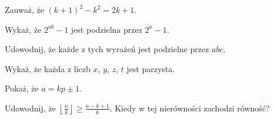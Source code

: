 
\begin{hints_list}
	\item Zauważ, że $(k + 1)^2 - k^2 = 2k + 1$.
	\item Wykaż, że $2^{ab} - 1$ jest podzielna przez $2^a - 1$.
	\item Udowodnij, że każde z tych wyrażeń jest podzielne przez $abc$.
	\item Wykaż, że każda z liczb $x$, $y$, $z$, $t$ jest parzysta.
	\item Pokaż, że $a = kp \pm 1$.
	\item Udowodnij, że $\left \lfloor \frac{n}{k} \right \rfloor \geqslant \frac{n - k + 1}{k}$. Kiedy w tej nierówności zachodzi równość?
\end{hints_list}